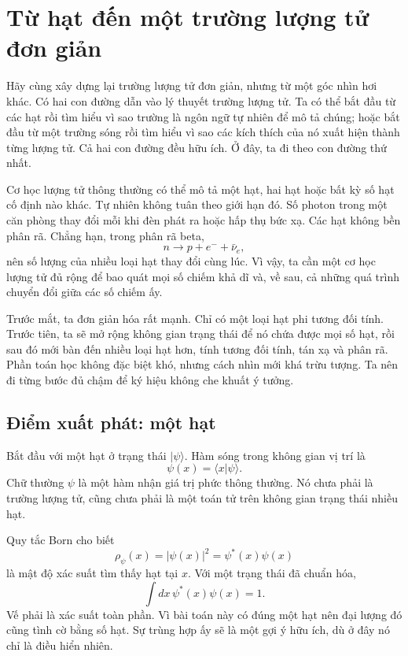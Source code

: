 \chapter{Từ hạt đến một trường lượng tử đơn giản}

Hãy cùng xây dựng lại trường lượng tử đơn giản, nhưng từ một góc nhìn hơi khác. Có hai con đường dẫn vào lý thuyết trường lượng tử. Ta có thể bắt đầu từ các hạt rồi tìm hiểu vì sao trường là ngôn ngữ tự nhiên để mô tả chúng; hoặc bắt đầu từ một trường sóng rồi tìm hiểu vì sao các kích thích của nó xuất hiện thành từng lượng tử. Cả hai con đường đều hữu ích. Ở đây, ta đi theo con đường thứ nhất.

Cơ học lượng tử thông thường có thể mô tả một hạt, hai hạt hoặc bất kỳ số hạt cố định nào khác. Tự nhiên không tuân theo giới hạn đó. Số photon trong một căn phòng thay đổi mỗi khi đèn phát ra hoặc hấp thụ bức xạ. Các hạt không bền phân rã. Chẳng hạn, trong phân rã beta,
\begin{equation}
n\longrightarrow p+e^-+\bar{\nu}_e,
\end{equation}
nên số lượng của nhiều loại hạt thay đổi cùng lúc. Vì vậy, ta cần một cơ học lượng tử đủ rộng để bao quát mọi số chiếm khả dĩ và, về sau, cả những quá trình chuyển đổi giữa các số chiếm ấy.

Trước mắt, ta đơn giản hóa rất mạnh. Chỉ có một loại hạt phi tương đối tính. Trước tiên, ta sẽ mở rộng không gian trạng thái để nó chứa được mọi số hạt, rồi sau đó mới bàn đến nhiều loại hạt hơn, tính tương đối tính, tán xạ và phân rã. Phần toán học không đặc biệt khó, nhưng cách nhìn mới khá trừu tượng. Ta nên đi từng bước đủ chậm để ký hiệu không che khuất ý tưởng.

\section{Điểm xuất phát: một hạt}

Bắt đầu với một hạt ở trạng thái \(|\psi\rangle\). Hàm sóng trong không gian vị trí là
\begin{equation}
\psi(x)=\langle x|\psi\rangle.
\label{eq:l07-wavefunction}
\end{equation}
Chữ thường \(\psi\) là một hàm nhận giá trị phức thông thường. Nó chưa phải là trường lượng tử, cũng chưa phải là một toán tử trên không gian trạng thái nhiều hạt.

Quy tắc Born cho biết
\begin{equation}
\rho_\psi(x)=|\psi(x)|^2=\psi^*(x)\psi(x)
\label{eq:l07-born-density}
\end{equation}
là mật độ xác suất tìm thấy hạt tại \(x\). Với một trạng thái đã chuẩn hóa,
\begin{equation}
\int dx\,\psi^*(x)\psi(x)=1.
\label{eq:l07-one-particle-normalization}
\end{equation}
Vế phải là xác suất toàn phần. Vì bài toán này có đúng một hạt nên đại lượng đó cũng tình cờ bằng số hạt. Sự trùng hợp ấy sẽ là một gợi ý hữu ích, dù ở đây nó chỉ là điều hiển nhiên.

